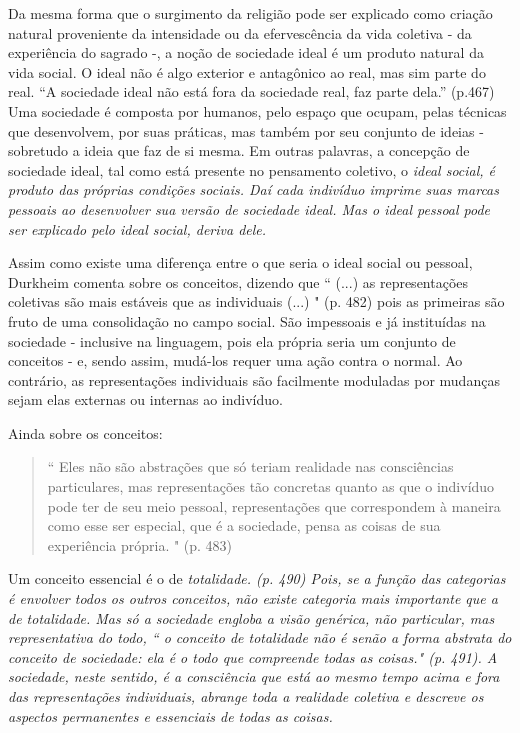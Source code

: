 \documentclass[12pt,a4paper]{article}
\begin{document}
Da mesma forma que o surgimento da religião pode ser explicado como criação natural proveniente da intensidade ou da efervescência da vida coletiva - da experiência do sagrado -, a noção de sociedade ideal é um produto natural da vida social. O ideal não é algo exterior e antagônico ao real, mas sim parte do real. 
``A sociedade ideal não está fora da sociedade real, faz parte dela.”
(p.467)
Uma sociedade é composta por humanos, pelo espaço que ocupam, pelas técnicas que desenvolvem, por suas práticas, mas também por seu conjunto de ideias - sobretudo a ideia que faz de si mesma. Em outras palavras, a concepção de sociedade ideal, tal como está presente no pensamento coletivo, o \em ideal social\em, é produto das próprias condições sociais. Daí cada indivíduo imprime suas marcas pessoais ao desenvolver sua versão de sociedade ideal. Mas o \em ideal pessoal \em pode ser explicado pelo ideal social, deriva dele.

Assim como existe uma diferença entre o que seria o ideal social ou pessoal, Durkheim comenta sobre os conceitos, dizendo que
``
(...) as representações coletivas são mais estáveis que as individuais (...)
"
(p. 482)
pois as primeiras são fruto de uma consolidação no campo social. São impessoais e já instituídas na sociedade - inclusive na linguagem, pois ela própria seria um conjunto de conceitos - e, sendo assim, mudá-los requer uma ação contra o normal. Ao contrário, as representações individuais são facilmente moduladas por mudanças sejam elas externas ou internas ao indivíduo.

Ainda sobre os conceitos:

\begin{quote}
    ``
    Eles não são abstrações que só teriam realidade nas consciências particulares, mas representações tão concretas quanto as que o indivíduo pode ter de seu meio pessoal, representações que correspondem à maneira como esse ser especial, que é a sociedade, pensa as coisas de sua experiência própria.
    "
    (p. 483)
\end{quote}

Um conceito essencial é o de \em totalidade\em. (p. 490) Pois, se a função das categorias é envolver todos os outros conceitos, não existe categoria mais importante que a de totalidade. Mas só a sociedade engloba a visão genérica, não particular, mas representativa do todo, `` o conceito de totalidade não é senão a forma abstrata do conceito de sociedade: ela é o todo que compreende todas as coisas." (p. 491). A sociedade, neste sentido, é a consciência que está ao mesmo tempo acima e fora das representações individuais, abrange toda a realidade coletiva e descreve os aspectos permanentes e essenciais de todas as coisas.
\end{document}
